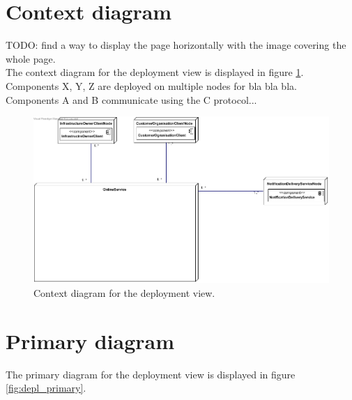 
\showdeploynotes{}

\section{Context diagram}
    TODO: find a way to display the page horizontally with the image covering the whole page. \\

    The context diagram for the deployment view is displayed in figure \ref{fig:depl_context}. \\

    Components X, Y, Z are deployed on multiple nodes for bla bla bla.\\
    Components A and B communicate using the C protocol...


    \begin{figure}[!htp]
    	\centering
        \includegraphics[width=\textwidth]{images/deployment-context}
    	\caption{Context diagram for the deployment view.}\label{fig:depl_context}
    \end{figure}


\section{Primary diagram}
    The primary diagram for the deployment view is displayed in figure \ref{fig:depl_primary}.

